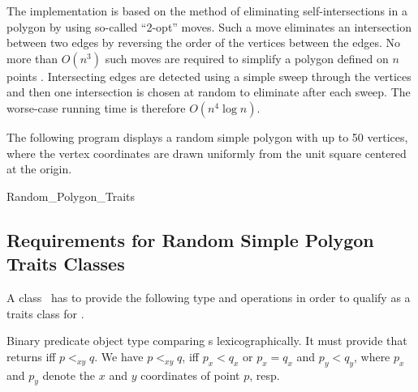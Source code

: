 \ccImplementation 
The implementation is based on the method of eliminating self-intersections in
a polygon by using so-called ``2-opt'' moves.  Such a move eliminates an 
intersection between two edges by reversing the order of the vertices between 
the edges.  No more than $O(n^3)$ such moves are required to simplify a polygon
defined on $n$ points \cite{ls-utstp-82}.
Intersecting edges are detected using a simple sweep through the vertices
and then one intersection is chosen at random to eliminate after each sweep. 
The worse-case running time is therefore $O(n^4 \log n)$.

\ccExample

The following program displays a random simple polygon with up to 50
vertices, where the vertex coordinates are drawn uniformly from the 
unit square centered at the origin.


\begin{ccAdvanced}
\ccAutoIndexingOff
\ccHtmlNoIndex\ccHtmlNoClassLinks\begin{ccClass}{Random_Polygon_Traits}
\subsection{Requirements for Random Simple Polygon Traits Classes}
\label{req_random_polygon_2_traits}

\ccDefinition
A class \ccClassName\ has to provide the following type and operations in
order to qualify as a traits class for .

\ccTypes
{}
       {Binary predicate object type comparing s lexicographically.
        It must provide  that 
        returns  iff $p <_{xy} q$.
        We have $p<_{xy}q$, iff $p_x < q_x$ or $p_x = q_x$ and $p_y < q_y$,
        where $p_x$ and $p_y$ denote the $x$ and $y$ coordinates of point $p$,
        resp.
       }
                        

\ccOperations


\end{ccClass}
\ccAutoIndexingOn
\end{ccAdvanced}
